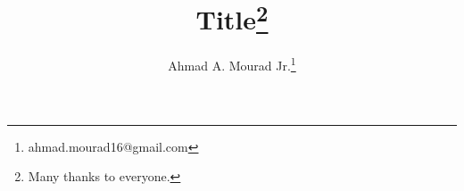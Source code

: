 




\title{Title\thanks{Many thanks to everyone.}}
\author{Ahmad A. Mourad Jr.\footnote{ahmad.mourad16@gmail.com}}


\maketitle



\tableofcontents









\printbibliography

\newpage

\appendix






